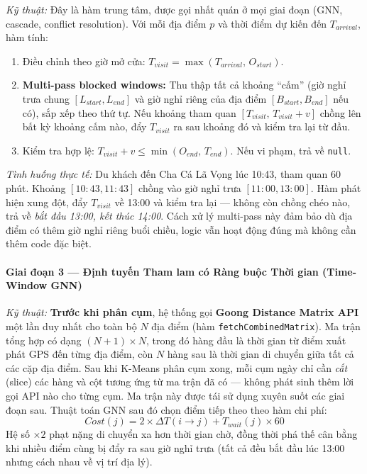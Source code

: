 \documentclass[12pt,a4paper]{article}
\begin{document}
\textit{Kỹ thuật:} Đây là hàm trung tâm, được gọi nhất quán ở mọi giai đoạn
(GNN, cascade, conflict resolution). Với mỗi địa điểm $p$ và thời điểm dự kiến
đến $T_{arrival}$, hàm tính:
\begin{enumerate}
  \item Điều chỉnh theo giờ mở cửa: $T_{visit} = \max(T_{arrival},\, O_{start})$.
  \item \textbf{Multi-pass blocked windows:} Thu thập tất cả khoảng ``cấm''
        (giờ nghỉ trưa chung $[L_{start}, L_{end}]$ và giờ nghỉ riêng của địa
        điểm $[B_{start}, B_{end}]$ nếu có), sắp xếp theo thứ tự. Nếu khoảng
        tham quan $[T_{visit},\, T_{visit}+v]$ chồng lên bất kỳ khoảng cấm nào,
        đẩy $T_{visit}$ ra sau khoảng đó và kiểm tra lại từ đầu.
  \item Kiểm tra hợp lệ: $T_{visit}+v \le \min(O_{end},\, T_{end})$. Nếu vi
        phạm, trả về \texttt{null}.
\end{enumerate}

\medskip
\textit{Tình huống thực tế:} Du khách đến Cha Cá Lã Vọng lúc 10:43, tham quan
60 phút. Khoảng $[10{:}43, 11{:}43]$ chồng vào giờ nghỉ trưa $[11{:}00, 13{:}00]$.
Hàm phát hiện xung đột, đẩy $T_{visit}$ về 13:00 và kiểm tra lại --- không còn
chồng chéo nào, trả về \textit{bắt đầu 13:00, kết thúc 14:00}. Cách xử lý
multi-pass này đảm bảo dù địa điểm có thêm giờ nghỉ riêng buổi chiều, logic vẫn
hoạt động đúng mà không cần thêm code đặc biệt.

\paragraph{Giai đoạn 3 --- Định tuyến Tham lam có Ràng buộc Thời gian (Time-Window GNN)}

\textit{Kỹ thuật:} \textbf{Trước khi phân cụm}, hệ thống gọi \textbf{Goong
Distance Matrix API} một lần duy nhất cho toàn bộ $N$ địa điểm (hàm
\texttt{fetchCombinedMatrix}). Ma trận tổng hợp có dạng $(N{+}1) \times N$,
trong đó hàng đầu là thời gian từ điểm xuất phát GPS đến từng địa điểm, còn
$N$ hàng sau là thời gian di chuyển giữa tất cả các cặp địa điểm. Sau khi
K-Means phân cụm xong, mỗi cụm ngày chỉ cần \textit{cắt} (slice) các hàng và
cột tương ứng từ ma trận đã có --- không phát sinh thêm lời gọi API nào cho
từng cụm. Ma trận này được tái sử dụng xuyên suốt các giai đoạn sau. Thuật toán
GNN sau đó chọn điểm tiếp theo theo hàm chi phí:
\begin{equation}
  Cost(j) = 2 \times \Delta T(i \to j) + T_{wait}(j) \times 60
\end{equation}
Hệ số $\times 2$ phạt nặng di chuyển xa hơn thời gian chờ, đồng thời phá thế
cân bằng khi nhiều điểm cùng bị đẩy ra sau giờ nghỉ trưa (tất cả đều bắt đầu
lúc 13:00 nhưng cách nhau về vị trí địa lý).
\end{document}
